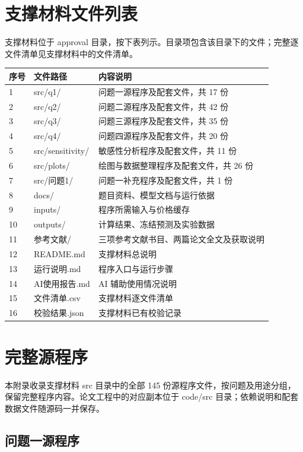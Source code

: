 \documentclass[zihao=-4,a4paper,UTF8,fontset=none]{ctexart}
\begin{document}
\section{支撑材料文件列表}
支撑材料位于 approval 目录，按下表列示。目录项包含该目录下的文件；完整逐文件清单见支撑材料中的文件清单。
\begin{longtable}{@{}p{}p{}p{}@{}}
\toprule
序号 & 文件路径 & 内容说明 \\
\midrule
\endhead
1 & src/q1/ & 问题一源程序及配套文件，共 17 份 \\
2 & src/q2/ & 问题二源程序及配套文件，共 42 份 \\
3 & src/q3/ & 问题三源程序及配套文件，共 35 份 \\
4 & src/q4/ & 问题四源程序及配套文件，共 20 份 \\
5 & src/sensitivity/ & 敏感性分析程序及配套文件，共 11 份 \\
6 & src/plots/ & 绘图与数据整理程序及配套文件，共 26 份 \\
7 & src/问题1/ & 问题一补充程序及配套文件，共 1 份 \\
8 & docs/ & 题目资料、模型文档与运行依据 \\
9 & inputs/ & 程序所需输入与价格缓存 \\
10 & outputs/ & 计算结果、冻结预测及实验数据 \\
11 & 参考文献/ & 三项参考文献书目、两篇论文全文及获取说明 \\
12 & README.md & 支撑材料总说明 \\
13 & 运行说明.md & 程序入口与运行步骤 \\
14 & AI使用报告.md & AI 辅助使用情况说明 \\
15 & 文件清单.csv & 支撑材料逐文件清单 \\
16 & 校验结果.json & 支撑材料已有校验记录 \\
\bottomrule
\end{longtable}

\section{完整源程序}
本附录收录支撑材料 src 目录中的全部 145 份源程序文件，按问题及用途分组，保留完整程序内容。论文工程中的对应副本位于 code/src 目录；依赖说明和配套数据文件随源码一并保存。
\lstset{basicstyle=\cumcmcodefont\scriptsize,breaklines=true,breakatwhitespace=false,columns=fullflexible,keepspaces=true,showstringspaces=false,tabsize=4}

\subsection{问题一源程序}
\end{document}
